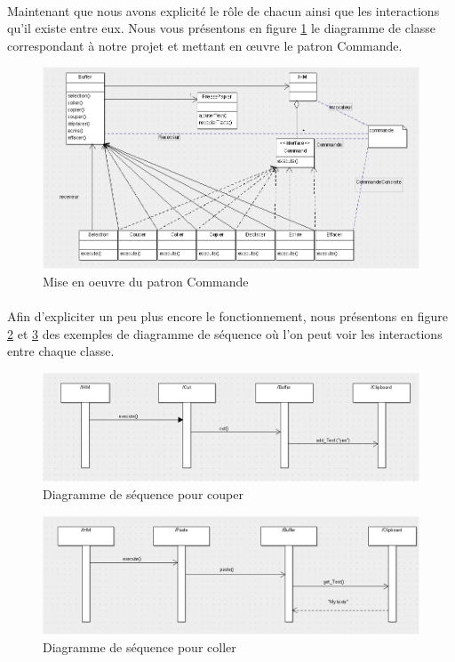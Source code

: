 \documentclass[a4paper,11pt]{article}
\begin{document}
\paragraph{}
Maintenant que nous avons explicité le rôle de chacun ainsi que les interactions qu'il existe entre eux. Nous vous présentons en figure \ref{command} le diagramme de classe correspondant à notre projet et mettant en œuvre le patron Commande.

\begin{figure}[!ht]
		\center
		\includegraphics [width=15cm]{./images/Command.png}
		\caption{Mise en oeuvre du patron Commande}
		\label{command}
\end{figure}

\paragraph{}
Afin d'expliciter un peu plus encore le fonctionnement, nous présentons en figure \ref{seq1} et \ref{seq2} des exemples de diagramme de séquence où l'on peut voir les interactions entre chaque classe.

\begin{figure}[!ht]
		\center
		\includegraphics [width=15cm]{./images/seq1.png}
		\caption{Diagramme de séquence pour couper}
		\label{seq1}
\end{figure}

\begin{figure}[!ht]
		\center
		\includegraphics [width=15cm]{./images/seq2.png}
		\caption{Diagramme de séquence pour coller}
		\label{seq2}
\end{figure}
\end{document}
